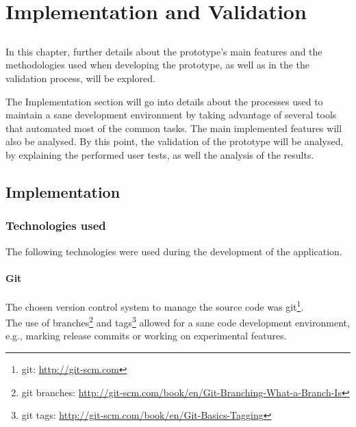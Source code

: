 

\chapter{Implementation and Validation}
\label{chap:chap4}

\section*{}

In this chapter, further details about the prototype's main features and the methodologies used when developing the prototype, as well as in the the validation process, will be explored.

The Implementation section will go into details about the processes used to maintain a sane development environment by taking advantage of several tools that automated most of the common tasks. The main implemented features will also be analysed.
By this point, the validation of the prototype will be analysed, by explaining the performed user tests, as well the analysis of the results.

\section{Implementation} %
\label{sec:implementation}

    
  \subsection{Technologies used} %
  \label{sub:technologies}

    The following technologies were used during the development of the application.

    \subsubsection{Git} %
    \label{ssub:git}
    
    The chosen version control system to manage the source code was git\footnote{git: \url{http://git-scm.com}}. \\
    The use of branches\footnote{git branches: \url{http://git-scm.com/book/en/Git-Branching-What-a-Branch-Is}} and tags\footnote{git tags: \url{http://git-scm.com/book/en/Git-Basics-Tagging}} allowed for a sane code development environment, e.g., marking release commits or working on experimental features.

